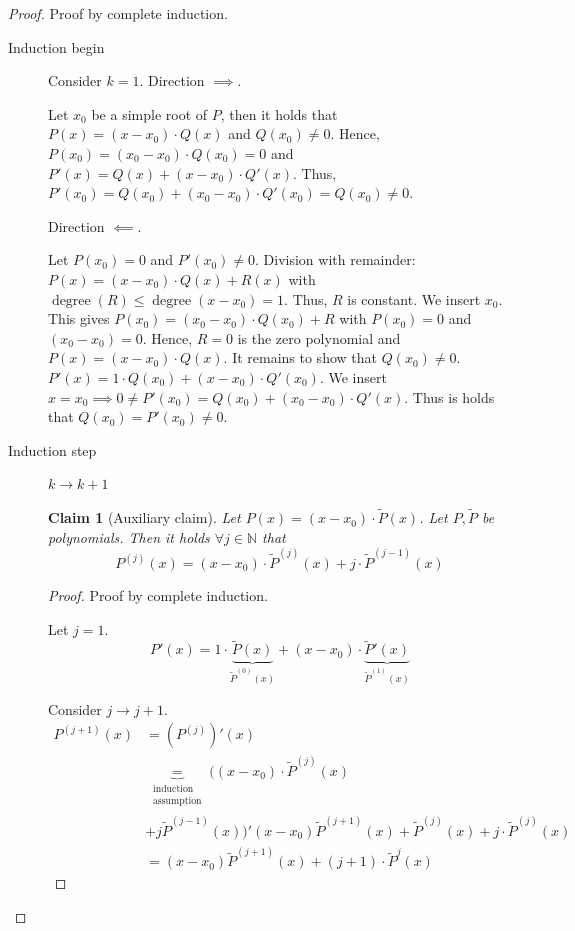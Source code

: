 \documentclass{article}
\newtheorem*{claim}{Claim}%
\begin{document}
\begin{proof}
  Proof by complete induction.

  \begin{description}
    \item[Induction begin]
      Consider $k=1$. Direction $\implies$.

      Let $x_0$ be a simple root of $P$, then it holds that $P(x) = (x - x_0) \cdot Q(x)$ and $Q(x_0) \neq 0$.
      Hence, $P(x_0) = (x_0 - x_0) \cdot Q(x_0) = 0$ and $P'(x) = Q(x) + (x - x_0) \cdot Q'(x)$.
      Thus, $P'(x_0) = Q(x_0) + (x_0 - x_0) \cdot Q'(x_0) = Q(x_0) \neq 0$.

      Direction $\impliedby$.

      Let $P(x_0) = 0$ and $P'(x_0) \neq 0$. Division with remainder: $P(x) = (x - x_0) \cdot Q(x) + R(x)$
      with $\operatorname{degree}(R) \leq \operatorname{degree}(x - x_0) = 1$. Thus, $R$ is constant.
      We insert $x_0$. This gives $P(x_0) = (x_0 - x_0) \cdot Q(x_0) + R$ with $P(x_0) = 0$ and $(x_0 - x_0) = 0$.
      Hence, $R = 0$ is the zero polynomial and $P(x) = (x - x_0) \cdot Q(x)$.
      It remains to show that $Q(x_0) \neq 0$. $P'(x) = 1\cdot Q(x_0) + (x - x_0) \cdot Q'(x_0)$.
      We insert $x = x_0 \implies 0 \neq P'(x_0) = Q(x_0) + (x_0 - x_0) \cdot Q'(x)$.
      Thus is holds that $Q(x_0) = P'(x_0) \neq 0$.
    \item[Induction step] $k \to k+1$ \hfill{}
      \begin{claim}[Auxiliary claim]
        Let $P(x) = (x - x_0) \cdot \tilde P(x)$.
        Let $P, \tilde P$ be polynomials. Then it holds $\forall j \in \mathbb N$ that
        \[ P^{(j)}(x) = (x - x_0) \cdot \tilde P^{(j)}(x) + j \cdot \tilde P^{(j-1)}(x) \]
      \end{claim}
      \begin{proof}
        Proof by complete induction.

        Let $j = 1$.
        \[ P'(x) = 1 \cdot \underbrace{\tilde P(x)}_{\tilde P^{(0)}(x)} + (x - x_0) \cdot \underbrace{\tilde P'(x)}_{\tilde P^{(1)}(x)} \]

        Consider $j \to j + 1$.
        \begin{align*}
          P^{(j+1)}(x) &= \left(P^{(j)}\right)'(x) \\
          &\underbrace{=}_{\substack{\text{induction} \\ \text{assumption}}} ((x - x_0) \cdot \tilde P^{(j)}(x) \\
          &+ j \tilde P^{(j-1)}(x))' (x - x_0) \tilde P^{(j+1)}(x) + \tilde P^{(j)}(x) + j \cdot \tilde P^{(j)}(x) \\
          &= (x - x_0) \tilde P^{(j+1)}(x) + (j + 1) \cdot \tilde P^{j}(x)
        \end{align*}
      \end{proof}


\end{description}
\end{proof}
\end{document}
